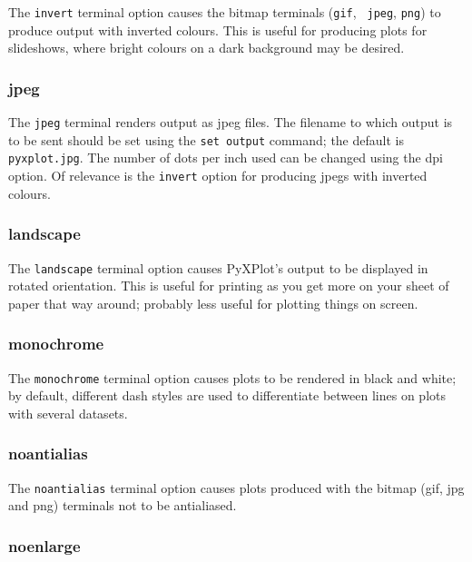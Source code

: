 The {\tt invert} terminal option causes the bitmap terminals ({\tt gif}, {\tt
jpeg}, {\tt png}) to produce output with inverted colours. This is useful for
producing plots for slideshows, where bright colours on a dark background may be
desired.


\subsubsection{jpeg}

The {\tt jpeg} terminal renders output as jpeg files. The filename to which
output is to be sent should be set using the {\tt set output} command; the
default is {\tt pyxplot.jpg}.  The number of dots per inch used can be changed
using the dpi option. Of relevance is the {\tt invert} option for producing
jpegs with inverted colours.


\subsubsection{landscape}

The {\tt landscape} terminal option causes PyXPlot's output to be displayed in
rotated orientation.  This is useful for printing as you get more on your sheet
of paper that way around; probably less useful for plotting things on screen.


\subsubsection{monochrome}

The {\tt monochrome} terminal option causes plots to be rendered in black and
white; by default, different dash styles are used to differentiate between
lines on plots with several datasets.


\subsubsection{noantialias}

The {\tt noantialias} terminal option causes plots produced with the bitmap
(gif, jpg and png) terminals not to be antialiased.


\subsubsection{noenlarge}

